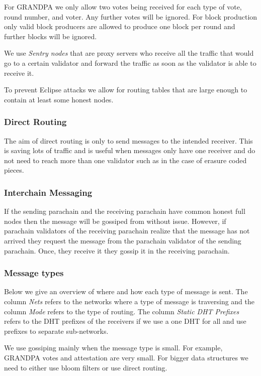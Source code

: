 For GRANDPA we only allow two votes being received for each type of vote, round number, and voter. Any further votes will be ignored. For block production only valid block producers are allowed to produce one block per round and further blocks will be ignored.

We use \emph{Sentry nodes} that are proxy servers who receive all the traffic that would go to a certain validator and forward the traffic as soon as the validator is able to receive it.

To prevent Eclipse attacks \cite{} we allow for routing tables that are large enough to contain at least some honest nodes.

\subsubsection{Direct Routing}
The aim of direct routing is only to send messages to the intended receiver.
This is saving lots of traffic and is useful when messages only have one receiver and do not need to reach more than one validator such as in the case of erasure coded pieces.

\subsubsection{Interchain Messaging}
If the sending parachain and the receiving parachain have common honest full nodes then the message will be gossiped from without issue.
However, if parachain validators of the receiving parachain realize that the message has not arrived they request the message from the parachain validator of the sending parachain.
Once, they receive it they gossip it in the receiving parachain.

\subsubsection{Message types}
Below we give an overview of where and how each type of message is sent. The column \emph{Nets} refers to the networks where a type of message is traversing and the column \emph{Mode} refers to the type of  routing. The column \emph{Static DHT Prefixes} refers to the DHT prefixes of the receivers if we use a one DHT for all and use prefixes to separate sub-networks.

We use gossiping mainly when the message type is small. For example, GRANDPA votes and attestation are very small. For bigger data structures we need to either use bloom filters or use direct routing.

